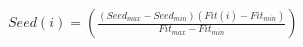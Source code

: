 $Seed(i)=\left ( \frac{\left ( Seed_{max}-Seed_{min} \right )\left ( Fit(i)-Fit_{min} \right )}{Fit_{max}-Fit_{min}} \right)$
